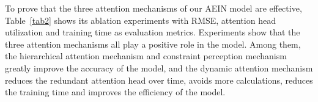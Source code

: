 To prove that the three attention mechanisms of our AEIN model are effective, Table~\ref{tab2} shows its 
ablation experiments with RMSE, attention head utilization and training time as evaluation metrics. Experiments 
show that the three attention mechanisms all play a positive role in the model. Among them, the hierarchical 
attention mechanism and constraint perception mechanism greatly improve the accuracy of the model, and the 
dynamic attention mechanism reduces the redundant attention head over time, avoids more calculations, reduces 
the training time and improves the efficiency of the model.
